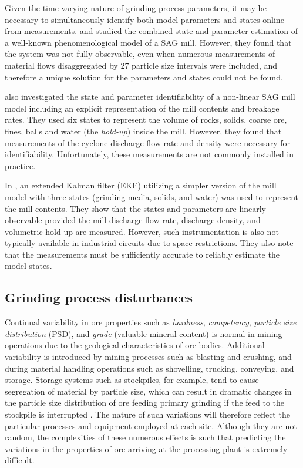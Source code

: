Given the time-varying nature of grinding process parameters, it may be necessary to simultaneously identify both model parameters and states online from measurements. \cite{apelt_inferential_2002} and \cite{apelt_inferential_2002-1} studied the combined state and parameter estimation of a well-known phenomenological model of a SAG mill. However, they found that the system was not fully observable, even when numerous  measurements of material flows disaggregated by 27 particle size intervals were included, and therefore a unique solution for the parameters and states could not be found.

\cite{le_roux_state_2016} also investigated the state and parameter identifiability of a non-linear SAG mill model including an explicit representation of the mill contents and breakage rates. They used six states to represent the volume of rocks, solids, coarse ore, fines, balls and water (the \textit{hold-up}) inside the mill. However, they found that measurements of the cyclone discharge flow rate and density were necessary for identifiability. Unfortunately, these measurements are not commonly installed in practice.

In \cite{le_roux_ekf_2017}, an extended Kalman filter (EKF) utilizing a simpler version of the mill model with three states (grinding media, solids, and water) was used to represent the mill contents. They show that the states and parameters are linearly observable provided the mill discharge flow-rate, discharge density, and volumetric hold-up are measured. However, such instrumentation is also not typically available in industrial circuits due to space restrictions. They also note that the measurements must be sufficiently accurate to reliably estimate the model states.

\subsection{Grinding process disturbances}

Continual variability in ore properties such as \textit{hardness}, \textit{competency}, \textit{particle size distribution} (PSD), and \textit{grade} (valuable mineral content) is normal in mining operations due to the geological characteristics of ore bodies. Additional variability is introduced by mining processes such as blasting and crushing, and during material handling operations such as shovelling, trucking, conveying, and storage. Storage systems such as stockpiles, for example, tend to cause segregation of material by particle size, which can result in dramatic changes in the particle size distribution of ore feeding primary grinding if the feed to the stockpile is interrupted \citep{estrada_hybrid_2014}. The nature of such variations will therefore reflect the particular processes and equipment employed at each site. Although they are not random, the complexities of these numerous effects is such that predicting the variations in the properties of ore arriving at the processing plant is extremely difficult.


